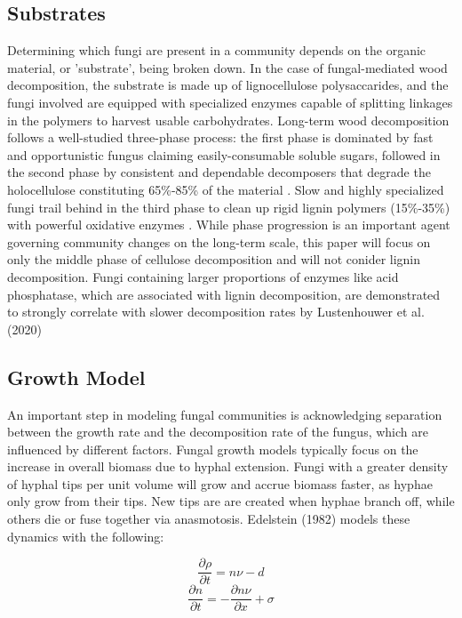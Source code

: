\documentclass[12pt]{article}
\begin{document}
\begin{multicols}{2}
\subsection{Substrates}
Determining which fungi are present in a community depends on the organic material, or 'substrate', being broken down. In the case of fungal-mediated wood decomposition, the substrate is made up of lignocellulose polysaccarides, and the fungi involved are equipped with specialized enzymes capable of splitting linkages in the polymers to harvest usable carbohydrates. Long-term wood decomposition follows a well-studied three-phase process: the first phase is dominated by fast and opportunistic fungus claiming easily-consumable soluble sugars, followed in the second phase by consistent and dependable decomposers that degrade the holocellulose constituting 65\%-85\% of the material \cite{Segato2014}. Slow and highly specialized fungi trail behind in the third phase to clean up rigid lignin polymers (15\%-35\%) with powerful oxidative enzymes \cite{Moorhead2006}. While phase progression is an important agent governing community changes on the long-term scale, this paper will focus on only the middle phase of cellulose decomposition and will not conider lignin decomposition. Fungi containing larger proportions of enzymes like acid phosphatase, which are associated with lignin decomposition, are demonstrated to strongly correlate with slower decomposition rates by Lustenhouwer et al. (2020)

\subsection{Growth Model}
An important step in modeling fungal communities is acknowledging separation between the growth rate and the decomposition rate of the fungus, which are influenced by different factors. Fungal growth models typically focus on the increase in overall biomass due to hyphal extension. Fungi with a greater density of hyphal tips per unit volume will grow and accrue biomass faster, as hyphae only grow from their tips. New tips are are created when hyphae branch off, while others die or fuse together via anasmotosis. Edelstein (1982) models these dynamics with the following:

\begin{equation}
\frac{\partial \rho}{\partial t} = n\nu - d
\end{equation}
\begin{equation}
\frac{\partial n}{\partial t} = -\frac{\partial n\nu}{\partial x} + \sigma
\end{equation}


\end{multicols}
\end{document}
